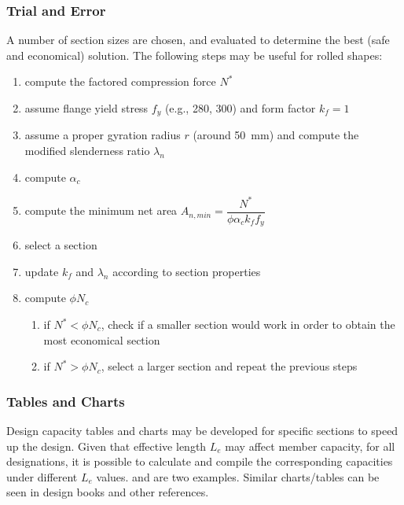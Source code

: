 \subsubsection{Trial and Error}
A number of section sizes are chosen, and evaluated to determine the best (safe and economical) solution.
The following steps may be useful for rolled shapes:
\begin{enumerate}
\item compute the factored compression force $N^*$
\item assume flange yield stress $f_y$ (e.g., \SI{280}{\mpa}, \SI{300}{\mpa}) and form factor $k_f=1$
\item assume a proper gyration radius $r$ (around \SI{50}{\mm}) and compute the modified slenderness ratio $\lambda_n$
\item compute $\alpha_c$
\item compute the minimum net area $A_{n,min}=\dfrac{N^*}{\phi\alpha_ck_ff_y}$
\item select a section
\item update $k_f$ and $\lambda_n$ according to section properties
\item compute $\phi{}N_c$
\begin{enumerate}
\item if $N^*<\phi{}N_c$, check if a smaller section would work in order to obtain the most economical section
\item if $N^*>\phi{}N_c$, select a larger section and repeat the previous steps
\end{enumerate}
\end{enumerate}
\subsubsection{Tables and Charts}
Design capacity tables and charts may be developed for specific sections to speed up the design.
Given that effective length $L_e$ may affect member capacity, for all designations, it is possible to calculate and compile the corresponding capacities under different $L_e$ values.
 and  are two examples.
Similar charts/tables can be seen in design books and other references.

